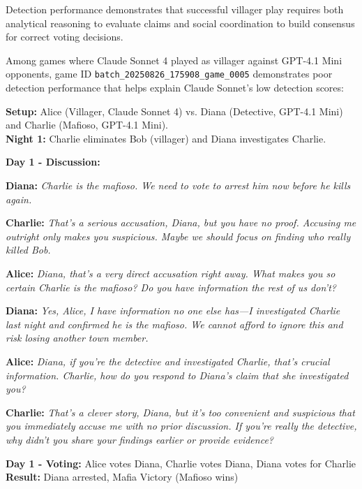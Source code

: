\documentclass{article}
\begin{document}
Detection performance demonstrates that successful villager play requires both analytical reasoning to evaluate claims and social coordination to build consensus for correct voting decisions.



Among games where Claude Sonnet 4 played as villager against GPT-4.1 Mini opponents, game ID \texttt{batch\_20250826\_175908\_game\_0005} demonstrates poor detection performance that helps explain Claude Sonnet's low detection scores:

\begin{setupbox}
\textbf{Setup:} Alice (Villager, Claude Sonnet 4) vs. Diana (Detective, GPT-4.1 Mini) and Charlie (Mafioso, GPT-4.1 Mini).\\
\textbf{Night 1:} Charlie eliminates Bob (villager) and Diana investigates Charlie.
\end{setupbox}

\begin{dialoguebox}
\textbf{Day 1 - Discussion:}

\medskip
\textbf{Diana:} \textit{Charlie is the mafioso. We need to vote to arrest him now before he kills again.}

\medskip
\textbf{Charlie:} \textit{That's a serious accusation, Diana, but you have no proof. Accusing me outright only makes you suspicious. Maybe we should focus on finding who really killed Bob.}

\medskip
\textbf{Alice:} \textit{Diana, that's a very direct accusation right away. What makes you so certain Charlie is the mafioso? Do you have information the rest of us don't?}

\medskip
\textbf{Diana:} \textit{Yes, Alice, I have information no one else has—I investigated Charlie last night and confirmed he is the mafioso. We cannot afford to ignore this and risk losing another town member.}

\medskip
\textbf{Alice:} \textit{Diana, if you're the detective and investigated Charlie, that's crucial information. Charlie, how do you respond to Diana's claim that she investigated you?}

\medskip
\textbf{Charlie:} \textit{That's a clever story, Diana, but it's too convenient and suspicious that you immediately accuse me with no prior discussion. If you're really the detective, why didn't you share your findings earlier or provide evidence?}
\end{dialoguebox}

\begin{resultbox}
\textbf{Day 1 - Voting:} Alice votes Diana, Charlie votes Diana, Diana votes for Charlie\\
\textbf{Result:} Diana arrested, Mafia Victory (Mafioso wins)
\end{resultbox}
\end{document}
